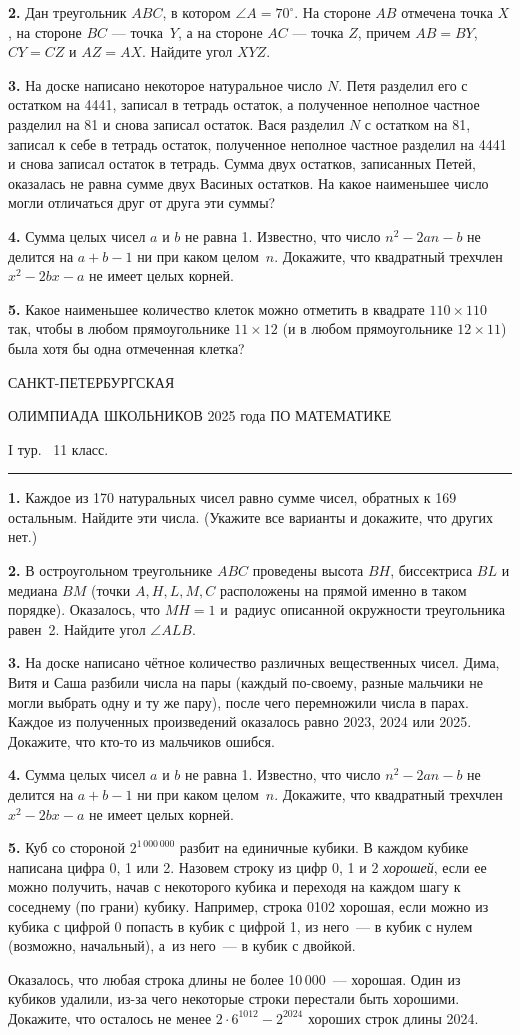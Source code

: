 \documentclass[12pt,a4paper]{article}
\def\q#1.{{\bf #1. }}
\begin{document}
\q2. Дан треугольник $ABC$, в котором $\angle A = 70^\circ$. На
стороне  $AB$ отмечена точка $X$, на стороне $BC$ --- точка~$Y$, а на
стороне $AC$ --- точка $Z$, причем $AB = BY$, $CY = CZ$ и $AZ =AX$.
Найдите угол $XYZ$.

\q3. На доске написано некоторое натуральное число $N$. Петя разделил его с остатком на 4441, записал в тетрадь остаток, а полученное неполное частное разделил на 81 и снова записал остаток. Вася разделил $N$ с остатком на 81, записал к себе в тетрадь остаток, полученное неполное частное разделил на 4441 и снова записал остаток в тетрадь. Сумма двух остатков, записанных  Петей, оказалась не равна сумме двух Васиных остатков. На какое наименьшее число могли отличаться друг от друга эти суммы?

\q4. Сумма целых чисел $a$ и $b$ не равна 1. Известно, что число $n^2-2an-b$ не делится на $a+b-1$ ни при каком целом~$n$. Докажите, что квадратный трехчлен $x^2-2bx-a$ не имеет целых корней.

\q5. Какое наименьшее количество клеток можно отметить в квадрате $110\times
110$ так, чтобы в любом прямоугольнике $11\times 12$ (и в любом прямоугольнике
$12\times 11$) была хотя бы одна отмеченная клетка?


\clearpage

\centerline{\sc САНКТ-ПЕТЕРБУРГСКАЯ}
\centerline{\sc ОЛИМПИАДА ШКОЛЬНИКОВ 2025 года ПО МАТЕМАТИКЕ}
\centerline{\sc I тур. \ 11 класс.}
\medskip
\hrule
\bigskip

\q1. Каждое из 170 натуральных чисел равно сумме чисел, обратных к 169 остальным. Найдите эти числа. (Укажите все варианты и докажите, что других нет.)

\q2. В остроугольном треугольнике $ABC$ проведены высота $BH$, биссектриса $BL$ и медиана $BM$ (точки $A,H,L,M,C$ расположены на прямой именно в таком порядке). Оказалось, что $MH=1$ и~радиус описанной окружности треугольника равен~2. Найдите угол $\angle ALB$.

\q3. На доске написано чётное количество различных вещественных чисел. Дима, Витя и Саша разбили числа на пары (каждый по-своему, разные мальчики не могли выбрать одну и ту же пару), после чего перемножили числа в парах. Каждое из полученных произведений оказалось равно 2023, 2024 или 2025. Докажите, что кто-то из мальчиков ошибся.

\q4. Сумма целых чисел $a$ и $b$ не равна 1. Известно, что число $n^2-2an-b$ не делится на $a+b-1$ ни при каком целом~$n$. Докажите, что квадратный трехчлен $x^2-2bx-a$ не имеет целых корней.

\q5. Куб со стороной $2^{1\,000\,000}$ разбит на единичные кубики. В каждом кубике написана цифра 0, 1 или 2. Назовем строку из цифр 0, 1 и 2 \emph{хорошей}, если ее можно получить, начав с некоторого кубика и переходя на каждом шагу к соседнему (по грани) кубику. Например, строка 0102 хорошая, если можно из кубика с цифрой 0 попасть в кубик с цифрой 1, из него~--- в кубик с нулем (возможно, начальный), а~из него~--- в кубик с двойкой.

Оказалось, что любая строка длины не более 10\,000~--- хорошая. Один из кубиков удалили, из-за чего некоторые строки перестали быть хорошими.  Докажите, что осталось не менее $2\cdot 6^{1012}-2^{2024}$ хороших строк длины 2024.
\end{document}
